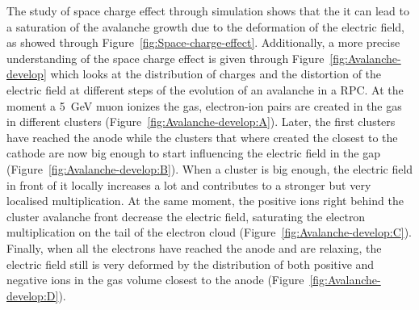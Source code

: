 	The study of space charge effect through simulation shows that the it can lead to a saturation of the avalanche growth due to the deformation of the electric field, as showed through Figure~\ref{fig:Space-charge-effect}. Additionally, a more precise understanding of the space charge effect is given through Figure~\ref{fig:Avalanche-develop} which looks at the distribution of charges and the distortion of the electric field at different steps of the evolution of an avalanche in a RPC. At the moment a \SI{5}{GeV} muon ionizes the gas, electron-ion pairs are created in the gas in different clusters (Figure~\ref{fig:Avalanche-develop:A}). Later, the first clusters have reached the anode while the clusters that where created the closest to the cathode are now big enough to start influencing the electric field in the gap (Figure~\ref{fig:Avalanche-develop:B}). When a cluster is big enough, the electric field in front of it locally increases a lot and contributes to a stronger but very localised multiplication. At the same moment, the positive ions right behind the cluster avalanche front decrease the electric field, saturating the electron multiplication on the tail of the electron cloud (Figure~\ref{fig:Avalanche-develop:C}). Finally, when all the electrons have reached the anode and are relaxing, the electric field still is very deformed by the distribution of both positive and negative ions in the gas volume closest to the anode (Figure~\ref{fig:Avalanche-develop:D}).
	
